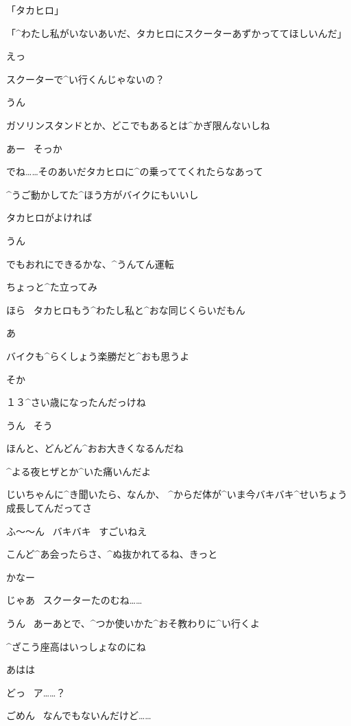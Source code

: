 \page[146]
\Alpha 「タカヒロ」

\page
\Alpha 「^{わたし}{私}がいないあいだ、タカヒロにスクーターあずかっててほしいんだ」

\page
\Takahiro えっ

\Takahiro スクーターで^{い}{行}くんじゃないの？

\Alpha うん

\Alpha ガソリンスタンドとか、どこでもあるとは^{かぎ}{限}んないしね

\Takahiro あー
\ そっか

\page
\Alpha でね……そのあいだタカヒロに^{の}{乗}っててくれたらなあって

\Alpha ^{うご}{動}かしてた^{ほう}{方}がバイクにもいいし

\Alpha タカヒロがよければ

\Takahiro うん

\Takahiro でもおれにできるかな、^{うんてん}{運転}

\Alpha ちょっと^{た}{立}ってみ

\page
\Alpha ほら
\ タカヒロもう^{わたし}{私}と^{おな}{同}じくらいだもん

\Takahiro あ

\Alpha バイクも^{らくしょう}{楽勝}だと^{おも}{思}うよ

\Takahiro そか

\page
\Alpha １３^{さい}{歳}になったんだっけね

\Takahiro うん
\ そう

\Alpha ほんと、どんどん^{おお}{大}きくなるんだね

\Takahiro ^{よる}{夜}ヒザとか^{いた}{痛}いんだよ

\Takahiro じいちゃんに^{き}{聞}いたら、なんか、
^{からだ}{体}が^{いま}{今}バキバキ^{せいちょう}{成長}してんだってさ

\page
\Alpha ふ〜〜ん
\ バキバキ
\ すごいねえ

\Alpha こんど^{あ}{会}ったらさ、^{ぬ}{抜}かれてるね、きっと

\Takahiro かなー

\Alpha じゃあ
\ スクーターたのむね……

\Takahiro うん
\ あーあとで、^{つか}{使}いかた^{おそ}{教}わりに^{い}{行}くよ

\page
\Alpha ^{ざこう}{座高}はいっしょなのにね

\Takahiro あはは

\page
\Takahiro どっ
\ ア……？

\page
\Alpha ごめん
\ なんでもないんだけど……

